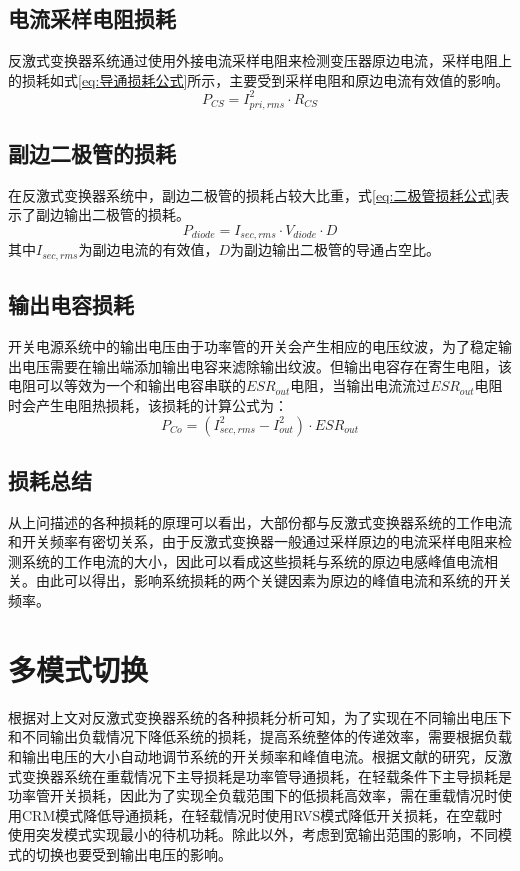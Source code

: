 \subsection{电流采样电阻损耗}

反激式变换器系统通过使用外接电流采样电阻来检测变压器原边电流，采样电阻上的损耗如式\eqref{eq:导通损耗公式}所示，主要受到采样电阻和原边电流有效值的影响。
\begin{equation}
    \label{eq:采样电阻损耗公式}
    P_{CS} = I_{pri,rms}^2  \cdot R_{CS} 
\end{equation}


\subsection{副边二极管的损耗}

在反激式变换器系统中，副边二极管的损耗占较大比重，式\eqref{eq:二极管损耗公式}表示了副边输出二极管的损耗。
\begin{equation}
    \label{eq:二极管损耗公式}
    P_{diode} = I_{sec,rms} \cdot V_{diode} \cdot D 
\end{equation}
其中$I_{sec,rms}$为副边电流的有效值，$D$为副边输出二极管的导通占空比。

\subsection{输出电容损耗}

开关电源系统中的输出电压由于功率管的开关会产生相应的电压纹波，为了稳定输出电压需要在输出端添加输出电容来滤除输出纹波。但输出电容存在寄生电阻，该电阻可以等效为一个和输出电容串联的$ESR_{out}$电阻，当输出电流流过$ESR_{out}$电阻时会产生电阻热损耗，该损耗的计算公式为：
\begin{equation}
    \label{eq:ESR损耗公式}
    P_{Co} = (I_{sec,rms}^2 - I_{out}^2) \cdot ESR_{out}
\end{equation}

\subsection{损耗总结}

从上问描述的各种损耗的原理可以看出，大部份都与反激式变换器系统的工作电流和开关频率有密切关系，由于反激式变换器一般通过采样原边的电流采样电阻来检测系统的工作电流的大小，因此可以看成这些损耗与系统的原边电感峰值电流相关。由此可以得出，影响系统损耗的两个关键因素为原边的峰值电流和系统的开关频率。

\section{多模式切换}
\label{sec:多模式切换}
根据对上文对反激式变换器系统的各种损耗分析可知，为了实现在不同输出电压下和不同输出负载情况下降低系统的损耗，提高系统整体的传递效率，需要根据负载和输出电压的大小自动地调节系统的开关频率和峰值电流。根据文献的研究，反激式变换器系统在重载情况下主导损耗是功率管导通损耗，在轻载条件下主导损耗是功率管开关损耗，因此为了实现全负载范围下的低损耗高效率，需在重载情况时使用CRM模式降低导通损耗，在轻载情况时使用RVS模式降低开关损耗，在空载时使用突发模式实现最小的待机功耗。除此以外，考虑到宽输出范围的影响，不同模式的切换也要受到输出电压的影响。

